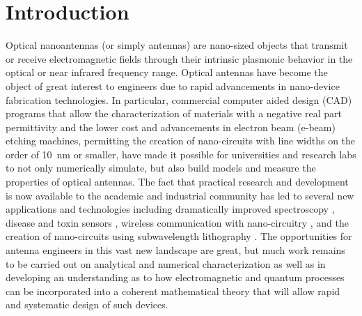 \documentclass[11pt]{article}
\begin{document}
\section{Introduction}
%
Optical nanoantennas (or simply antennas) are nano-sized objects that transmit or receive electromagnetic fields through their intrinsic plasmonic behavior in the optical or near infrared frequency range. Optical antennas have become the object of great interest to engineers due to rapid advancements in nano-device fabrication technologies. In particular, commercial computer aided design (CAD) programs that allow the characterization of materials with a negative real part permittivity and the lower cost and advancements in electron beam (e-beam) etching machines, permitting the creation of nano-circuits with line widths on the order of \SI{10}{\nm} or smaller, have made it possible for universities and research labs to not only numerically simulate, but also build models and measure the properties of optical antennas. The fact that practical research and development is now available to the academic and industrial community has led to several new applications and technologies including dramatically improved spectroscopy
\cite{Ouyang1992,Nie1997, Kneipp1997}, disease and toxin sensors \cite{Arduini2010, Nevels2012}, wireless communication with nano-circuitry \cite{Adato2011}, and the creation of nano-circuits using subwavelength lithography \cite{Torres2003, Ishihara2006}. The opportunities for antenna engineers in this vast new landscape are great, but much work remains to be carried out on analytical and numerical characterization as well as in developing an understanding as to how electromagnetic and quantum processes can be incorporated into a coherent mathematical theory that will allow rapid and systematic design of such devices.
\end{document}
